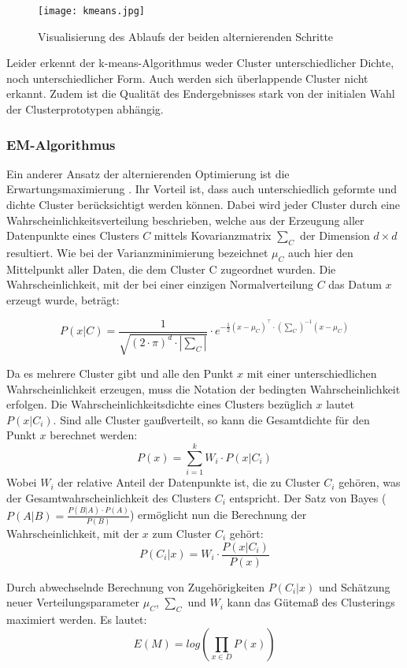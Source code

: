 \documentclass[11pt,ceqn]{book}
\begin{document}
\begin{figure}[H]
\centering
\texttt{[image: kmeans.jpg]}
\caption{Visualisierung des Ablaufs der beiden alternierenden Schritte}\label{cluster}
\end{figure}

Leider erkennt der k-means-Algorithmus weder Cluster unterschiedlicher Dichte, noch unterschiedlicher Form. Auch werden sich überlappende Cluster nicht erkannt. Zudem ist die Qualität des Endergebnisses stark von der initialen Wahl der Clusterprototypen abhängig.

\subsubsection{EM-Algorithmus}
Ein anderer Ansatz der alternierenden Optimierung ist die Erwartungsmaximierung \cite{emalg}. Ihr Vorteil ist, dass auch unterschiedlich geformte und dichte Cluster berücksichtigt werden können. Dabei wird jeder Cluster durch eine Wahrscheinlichkeitsverteilung beschrieben, welche aus der Erzeugung aller Datenpunkte eines Clusters $C$ mittels Kovarianzmatrix $\sum_C$ der Dimension $d \times d$ resultiert. Wie bei der Varianzminimierung bezeichnet $\mu_C$ auch hier den Mittelpunkt aller Daten, die dem Cluster C zugeordnet wurden. Die Wahrscheinlichkeit, mit der bei einer einzigen Normalverteilung $C$ das Datum $x$ erzeugt wurde, beträgt:

$$P(x|C) = \frac{1}{\sqrt{(2\cdot \pi)^d \cdot |\sum_C|}} \cdot e^{-\frac{1}{2}(x - \mu_C)^{\top} \cdot \left(\sum_C\right)^{-1}(x - \mu_C)}$$ 

Da es mehrere Cluster gibt und alle den Punkt $x$ mit einer unterschiedlichen Wahrscheinlichkeit erzeugen, muss die Notation der bedingten Wahrscheinlichkeit erfolgen. Die Wahrscheinlichkeitsdichte eines Clusters bezüglich $x$ lautet $P(x|C_i)$. Sind alle Cluster gaußverteilt, so kann die Gesamtdichte für den Punkt $x$ berechnet werden: $$P(x) = \sum_{i=1}^k W_i \cdot P(x|C_i)$$ 
Wobei $W_i$ der relative Anteil der Datenpunkte ist, die zu Cluster $C_i$ gehören, was der Gesamtwahrscheinlichkeit des Clusters $C_i$ entspricht. Der Satz von Bayes ($P(A|B) = \frac{P(B|A)\cdot P(A)}{P(B)}$) ermöglicht nun die Berechnung der Wahrscheinlichkeit, mit der $x$ zum Cluster $C_i$ gehört:
$$P(C_i|x) = W_i \cdot \frac{P(x|C_i)}{P(x)}$$

Durch abwechselnde Berechnung von Zugehörigkeiten $P(C_i|x)$ und Schätzung neuer Verteilungsparameter $\mu_C$, $\sum_C$ und $W_i$ kann das Gütemaß des Clusterings maximiert werden. Es lautet:
$$E(M) = log\left(\prod_{x \in D} P(x)\right)$$
\end{document}
